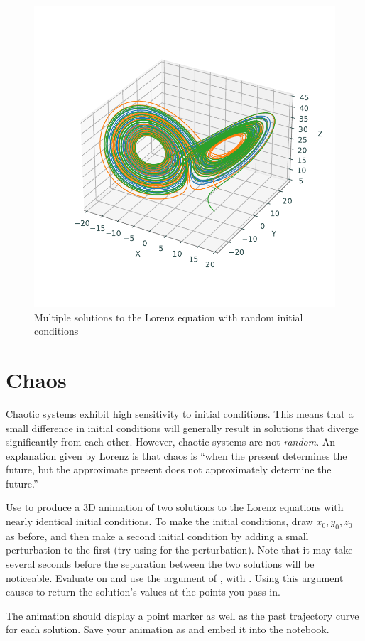 \begin{figure}
\includegraphics[width=\textwidth]{figures/Multiple_Lorenz.pdf}
\caption{Multiple solutions to the Lorenz equation with random initial conditions}
\label{fig:Multiple_Lorenz}
\end{figure}

\section*{Chaos}
Chaotic systems exhibit high sensitivity to initial conditions. 
This means that a small difference in initial conditions will generally result in solutions that diverge significantly from each other. 
However, chaotic systems are not \textit{random}. 
An explanation given by Lorenz is that chaos is ``when the present determines the future, but the approximate present does not approximately determine the future.''

\begin{problem}
\label{lorenz:prob:chaos}
Use  to produce a 3D animation of two solutions to the Lorenz equations with nearly identical initial conditions. To make the initial conditions, draw $x_0,y_0,z_0$ as before, and then make a second initial condition by adding a small perturbation to the first (try using  for the perturbation). Note that it may take several seconds before the separation between the two solutions will be noticeable. Evaluate on  and use the  argument of , with . Using this argument causes  to return the solution's values at the points you pass in.

The animation should display a point marker as well as the past trajectory curve for each solution. 
Save your animation as  and embed it into the notebook.
\end{problem}

